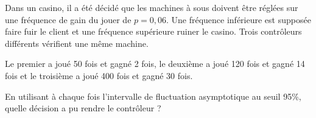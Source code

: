 
Dans un casino, il a été décidé que les \og{}machines à sous\fg{} doivent être réglées sur une fréquence de gain du jouer de $p=0,06$.
Une fréquence inférieure est supposée faire fuir le client et une fréquence supérieure ruiner le casino.
Trois contrôleurs différents vérifient une même machine.

Le premier a joué 50 fois et gagné 2 fois, le deuxième a joué 120 fois et gagné 14 fois et le troisième a joué 400 fois et gagné 30 fois.

En utilisant à chaque fois l'intervalle de fluctuation asymptotique au seuil 95\:\%, quelle décision a pu rendre le contrôleur ?
